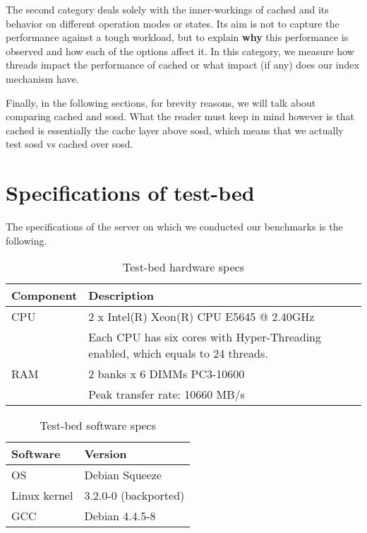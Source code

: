 The second category deals solely with the inner-workings of cached and its 
behavior on different operation modes or states. Its aim is not to capture the 
performance against a tough workload, but to explain \textbf{why} this 
performance is observed and how each of the options affect it. In this 
category, we measure how threads impact the performance of cached or what 
impact (if any) does our index mechanism have.

Finally, in the following sections, for brevity reasons, we will talk about 
comparing cached and sosd. What the reader must keep in mind however is that 
cached is essentially the cache layer above sosd, which means that we actually 
test sosd vs cached over sosd.

\section{Specifications of test-bed}\label{sec:test-bed}

The specifications of the server on which we conducted our benchmarks is the 
following.

\begin{table}[H]
	\centering
	\begin{tabular}{ | l | l | }
		\hline
		Component & Description \\ \hline \hline
		CPU &  2 x Intel(R) Xeon(R) CPU E5645 @ 2.40GHz \cite{e5645} \\
		 & Each CPU has six cores with Hyper-Threading enabled, which equals to 
		 24 threads. \\ \hline
		RAΜ & 2 banks x 6 DIMMs PC3-10600 \\
		& Peak transfer rate: 10660 MB/s \\ \hline
	\end{tabular}
	\caption{Test-bed hardware specs}
	\label{tab:specs}
\end{table}

\begin{table}[H]
	\centering
	\begin{tabular}{ | l | l | }
		\hline
		Software & Version \\ \hline \hline
		OS &  Debian Squeeze \\ \hline
		Linux kernel & 3.2.0-0 (backported) \\ \hline
		GCC & Debian 4.4.5-8 \\ \hline
	\end{tabular}
	\caption{Test-bed software specs}
	\label{tab:specs}
\end{table}

